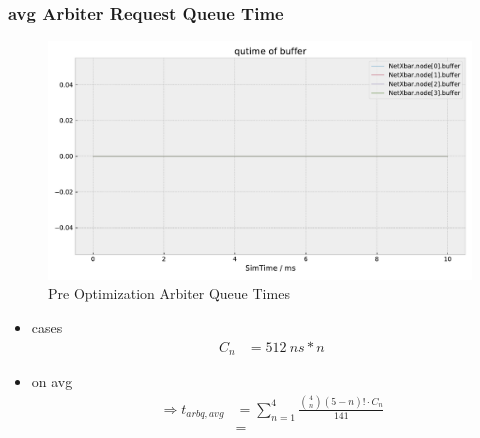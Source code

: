 \documentclass[]{scrartcl}
\begin{document}
    \subsubsection{avg Arbiter Request Queue Time}
        \begin{figure}[ht]
            \centering
            \includegraphics[width=\columnwidth, page=7]{../../python/results/preopt-General-0}
            \caption{Pre Optimization Arbiter Queue Times}%
            \label{fig:preopt-arbiter-qtime}
        \end{figure}
        \begin{itemize}
            \item cases
                \begin{align}
                    C_n &= \SI{512}{ns} * n
                \end{align}
            \item on avg
                \begin{align}
                    \Rightarrow t_{arbq,avg} &= \sum_{n=1}^4 \frac{\binom{4}{n}\left( 5-n \right)! \cdot C_n }{141}\\
                                             &=
                \end{align}
        \end{itemize}
\end{document}
